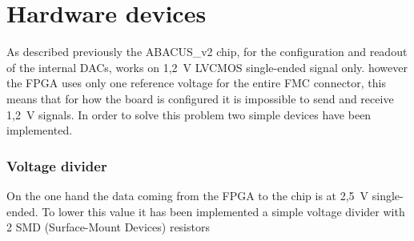 \section{Hardware devices}\label{hardware}
\noindent As described previously the ABACUS\_v2 chip, for the configuration and readout of the internal DACs, works on 1,2~V LVCMOS single-ended signal only. however the FPGA uses only one reference voltage for the entire FMC connector, this means that for how the board is configured it is impossible to send and receive 1,2~V signals.
In order to solve this problem two simple devices have been implemented.
\subsubsection{Voltage divider}
On the one hand the data coming from the FPGA to the chip is at 2,5~V single-ended. To lower this value it has been implemented a simple voltage divider with 2 SMD (Surface-Mount Devices) resistors
